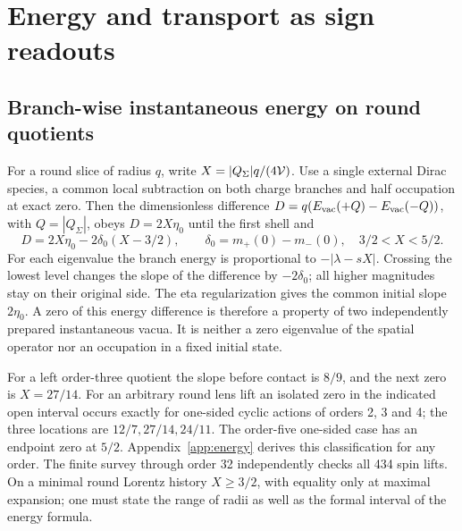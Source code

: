 \section{Energy and transport as sign readouts}\label{sec:device}
\subsection{Branch-wise instantaneous energy on round quotients}
For a round slice of radius \(q\), write \(X=|Q_\Sigma|q/(4\mathcal V)\). Use a single external Dirac species, a common local subtraction on both charge branches and half occupation at exact zero. Then the dimensionless difference \(D=q(E_{\rm vac}(+Q)-E_{\rm vac}(-Q))\), with \(Q=|Q_\Sigma|\), obeys \(D=2X\eta_0\) until the first shell and
\begin{equation}
 D=2X\eta_0-2\delta_0(X-3/2),\qquad
 \delta_0=m_+(0)-m_-(0),\quad 3/2<X<5/2 .
 \label{eq:energy}
\end{equation}
For each eigenvalue the branch energy is proportional to \(-|\lambda-sX|\). Crossing the lowest level changes the slope of the difference by \(-2\delta_0\); all higher magnitudes stay on their original side. The eta regularization gives the common initial slope \(2\eta_0\). A zero of this energy difference is therefore a property of two independently prepared instantaneous vacua. It is neither a zero eigenvalue of the spatial operator nor an occupation in a fixed initial state.

For a left order-three quotient the slope before contact is \(8/9\), and the next zero is \(X=27/14\). For an arbitrary round lens lift an isolated zero in the indicated open interval occurs exactly for one-sided cyclic actions of orders 2, 3 and 4; the three locations are \(12/7,27/14,24/11\). The order-five one-sided case has an endpoint zero at \(5/2\). Appendix~\ref{app:energy} derives this classification for any order. The finite survey through order 32 independently checks all 434 spin lifts. On a minimal round Lorentz history \(X\ge3/2\), with equality only at maximal expansion; one must state the range of radii as well as the formal interval of the energy formula.


